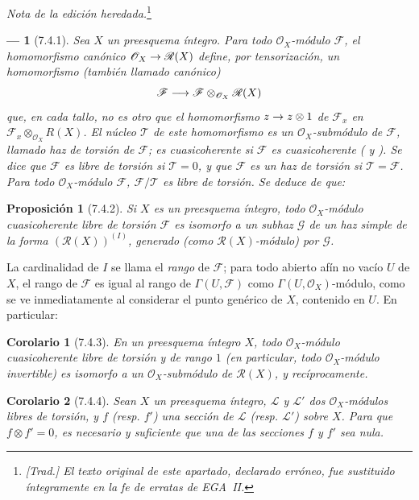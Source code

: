 \documentclass[oneside]{amsart}
\theoremstyle{ega-env-style}
\newtheorem*{env}{---}
\theoremstyle{ega-thm-env-style}
\newtheorem*{proposition}{Proposición}
\newtheorem*{corollary}{Corolario}
\theoremstyle{ega-defn-env-style}
\renewcommand{\to}{\mathchoice{\longrightarrow}{\rightarrow}{\rightarrow}{\rightarrow}}
\let\EGAOriginalLabel\label
\renewcommand{\label}[1]{\phantomsection\EGAOriginalLabel{#1}}
\begin{document}
\par\noindent\textit{Nota de la edición heredada.}\footnote{\emph{[Trad.] El texto original de este apartado, declarado erróneo, fue sustituido íntegramente en la fe de erratas de EGA~II.}}\par
\begin{env}[7.4.1]
\label{I.7.4.1}
Sea $X$ un preesquema \emph{íntegro}.
Para todo $\mathscr{O}_X$-módulo $\mathscr{F}$, el homomorfismo canónico $\mathscr{O}_X\to\mathscr{R}(X)$ define, por tensorización, un homomorfismo (también llamado \emph{canónico}) \[
  \mathscr{F}\to
  \mathscr{F}\otimes_{\mathscr{O}_X}\mathscr{R}(X)
\] que, en cada tallo, no es otro que el homomorfismo $z\to z\otimes 1$ de $\mathscr{F}_x$ en $\mathscr{F}_x\otimes_{\mathscr{O}_X}R(X)$.
El \emph{núcleo $\mathscr{T}$} de este homomorfismo es un $\mathscr{O}_X$-submódulo de $\mathscr{F}$, llamado \emph{haz de torsión} de $\mathscr{F}$; es cuasicoherente si $\mathscr{F}$ es cuasicoherente ( y ).
Se dice que $\mathscr{F}$ es \emph{libre de torsión} si $\mathscr{T}=0$, y que $\mathscr{F}$ es un \emph{haz de torsión} si $\mathscr{T}=\mathscr{F}$.
Para todo $\mathscr{O}_X$-módulo $\mathscr{F}$, $\mathscr{F}/\mathscr{T}$ es libre de torsión.
Se deduce de  que:
\end{env}

\begin{proposition}[7.4.2]
\label{I.7.4.2}
Si $X$ es un preesquema íntegro, todo $\mathscr{O}_X$-módulo cuasicoherente libre de torsión $\mathscr{F}$ es isomorfo a un subhaz $\mathscr{G}$ de un haz simple de la forma $(\mathscr{R}(X))^{(I)}$, generado (como $\mathscr{R}(X)$-módulo) por $\mathscr{G}$.
\end{proposition}

La cardinalidad de $I$ se llama el \emph{rango} de $\mathscr{F}$; para todo abierto afín no vacío $U$ de $X$, el rango de $\mathscr{F}$ es igual al rango de $\Gamma(U,\mathscr{F})$ como $\Gamma(U,\mathscr{O}_X)$-módulo, como se ve inmediatamente al considerar el punto genérico de $X$, contenido en $U$.
En particular:
\begin{corollary}[7.4.3]
\label{I.7.4.3}
En un preesquema íntegro $X$, todo $\mathscr{O}_X$-módulo cuasicoherente libre de torsión y de rango $1$ (en particular, todo $\mathscr{O}_X$-módulo invertible) es isomorfo a un $\mathscr{O}_X$-submódulo de $\mathscr{R}(X)$, y recíprocamente.
\end{corollary}

\begin{corollary}[7.4.4]
\label{I.7.4.4}
Sean $X$ un preesquema íntegro, $\mathscr{L}$ y $\mathscr{L}'$ dos $\mathscr{O}_X$-módulos libres de torsión, y $f$ \textup{(resp. $f'$)} una sección de $\mathscr{L}$ \textup{(resp. $\mathscr{L}'$)} sobre $X$.
Para que $f\otimes f'=0$, es necesario y suficiente que una de las secciones $f$ y $f'$ sea nula.
\end{corollary}
\end{document}
